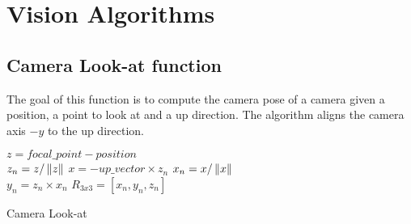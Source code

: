 \section{Vision Algorithms}

\subsection{Camera Look-at function}
The goal of this function is to compute the camera pose of a camera given a position, a point to look at and a up direction. The algorithm aligns the camera axis $-y$ to the up direction.

\begin{algorithm}[H]
\DontPrintSemicolon
{}
$z = focal\_point - position $ \\
$z_n = z / \left\lVert z\right\rVert$ 
$x = -up\_vector \times z_n$  
$x_n = x/\left\lVert x\right\rVert$ \\
$y_n = z_n \times x_n$ 
$R_{3x3} = [x_n, y_n, z_n]$ 
\caption{Camera Look-at}
\end{algorithm}
